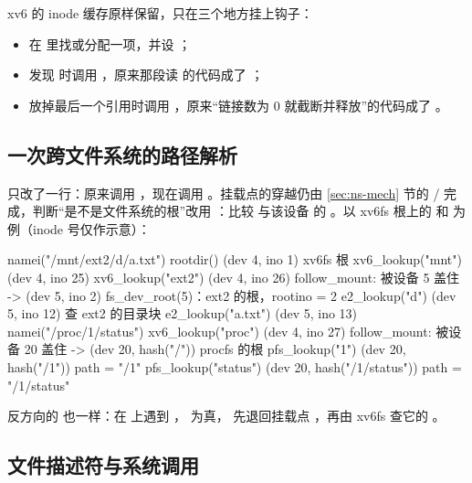 xv6 的 inode 缓存原样保留，只在三个地方挂上钩子：

\begin{itemize}
  \item {} 在  里找或分配一项，并设 ；
  \item {} 发现  时调用 ，原来那段读  的代码成了 ；
  \item {} 放掉最后一个引用时调用 ，原来“链接数为 0 就截断并释放”的代码成了 。
\end{itemize}

\subsection{一次跨文件系统的路径解析}

 只改了一行：原来调用 ，现在调用 。挂载点的穿越仍由 \ref{sec:ns-mech} 节的 / 完成，判断“是不是文件系统的根”改用 ：比较  与该设备  的 。以 xv6fs 根上的  和  为例（inode 号仅作示意）：

\begin{txtcode}
namei("/mnt/ext2/d/a.txt")
  rootdir()             (dev 4, ino 1)      xv6fs 根
  xv6_lookup("mnt")     (dev 4, ino 25)
  xv6_lookup("ext2")    (dev 4, ino 26)     follow_mount: 被设备 5 盖住
                     -> (dev 5, ino 2)      fs_dev_root(5)：ext2 的根，rootino = 2
  e2_lookup("d")        (dev 5, ino 12)     查 ext2 的目录块
  e2_lookup("a.txt")    (dev 5, ino 13)
namei("/proc/1/status")
  xv6_lookup("proc")    (dev 4, ino 27)     follow_mount: 被设备 20 盖住
                     -> (dev 20, hash("/"))           procfs 的根
  pfs_lookup("1")       (dev 20, hash("/1"))          path = "/1"
  pfs_lookup("status")  (dev 20, hash("/1/status"))   path = "/1/status"
\end{txtcode}

反方向的  也一样：在  上遇到 ， 为真， 先退回挂载点 ，再由 xv6fs 查它的 。

\subsection{文件描述符与系统调用}

